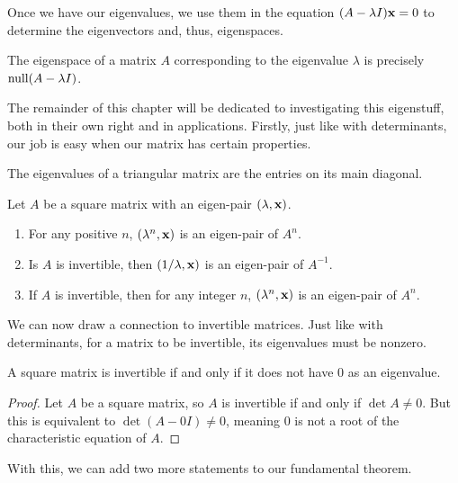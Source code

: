 \documentclass[../m073main.tex]{subfiles}
\begin{document}
Once we have our eigenvalues, we use them in the equation $(A - \lambda I) \mathbf{x} = 0$ to determine the eigenvectors and, thus, eigenspaces.

\begin{theorem}
	The eigenspace of a matrix $A$ corresponding to the eigenvalue $\lambda$ is precisely $\textrm{null} (A - \lambda I)$.
\end{theorem}

The remainder of this chapter will be dedicated to investigating this eigenstuff, both in their own right and in applications.
Firstly, just like with determinants, our job is easy when our matrix has certain properties.

\begin{theorem}
	The eigenvalues of a triangular matrix are the entries on its main diagonal.
\end{theorem}

\begin{theorem}
	Let $A$ be a square matrix with an eigen-pair $(\lambda, \mathbf{x})$.
	\begin{enumerate}[label=(\alph*)]
		\item For any positive $n$, $(\lambda^n, \mathbf{x})$ is an eigen-pair of $A^n$.
		\item Is $A$ is invertible, then $(1/\lambda, \mathbf{x})$ is an eigen-pair of $A^{-1}$.
		\item If $A$ is invertible, then for any integer $n$, $(\lambda^n, \mathbf{x})$ is an eigen-pair of $A^n$.
	\end{enumerate}
\end{theorem}

We can now draw a connection to invertible matrices.
Just like with determinants, for a matrix to be invertible, its eigenvalues must be nonzero.

\begin{theorem}
	A square matrix is invertible if and only if it does not have 0 as an eigenvalue.
\end{theorem}

\begin{proof}
	Let $A$ be a square matrix, so $A$ is invertible if and only if $\det A \neq 0$.
	But this is equivalent to $\det (A - 0I) \neq 0$, meaning 0 is not a root of the characteristic equation of $A$.
\end{proof}

With this, we can add two more statements to our fundamental theorem.
\end{document}
